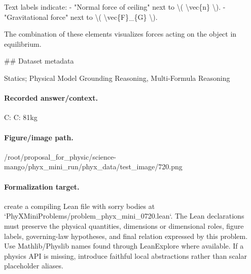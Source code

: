 Text labels indicate:
- "Normal force of ceiling" next to \textbackslash{}( \textbackslash{}vec\{n\} \textbackslash{}).
- "Gravitational force" next to \textbackslash{}( \textbackslash{}vec\{F\}\_\{G\} \textbackslash{}).

The combination of these elements visualizes forces acting on the object in equilibrium.

\#\# Dataset metadata

Statics; Physical Model Grounding Reasoning, Multi-Formula Reasoning

\paragraph{Recorded answer/context.}
C: C: 81kg

\paragraph{Figure/image path.}
/root/proposal\_for\_physic/science-mango/phyx\_mini\_run/phyx\_data/test\_image/720.png

\paragraph{Formalization target.}
create a compiling Lean file with sorry bodies at `PhyXMiniProblems/problem\_phyx\_mini\_0720.lean`. The Lean declarations must preserve the physical quantities, dimensions or dimensional roles, figure labels, governing-law hypotheses, and final relation expressed by this problem.
Use Mathlib/Physlib names found through LeanExplore where available. If a physics API is missing, introduce faithful local abstractions rather than scalar placeholder aliases.

